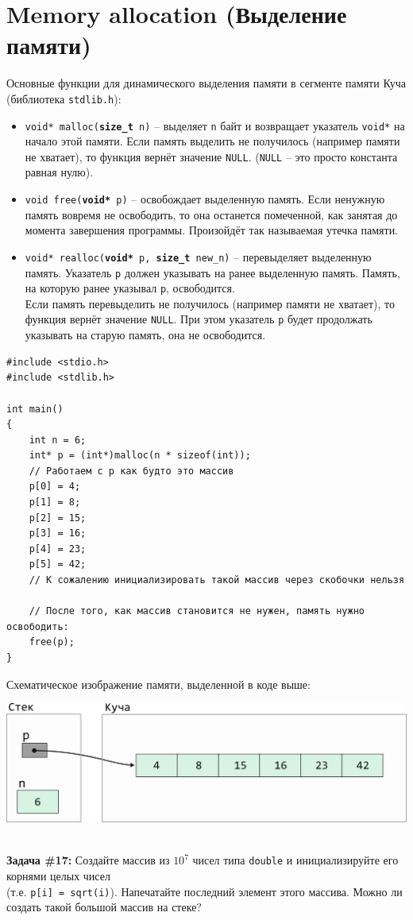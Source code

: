 \documentclass{article}
\begin{document}
\section*{Memory allocation (Выделение памяти)}
Основные функции для динамического выделения памяти в сегменте памяти Куча (библиотека \texttt{stdlib.h}):
\begin{itemize}
\item \texttt{void* malloc(\textbf{size\_t} n)} -- выделяет \texttt{n} байт и возвращает указатель \texttt{void*}
на начало этой памяти. Если память выделить не получилось (например памяти не хватает), то функция вернёт значение \texttt{NULL}. (\texttt{NULL} -- это просто константа равная нулю). \\
\item \texttt{void free(\textbf{void*} p)} -- освобождает выделенную память. Если ненужную память вовремя не освободить, то она останется помеченной, как занятая до момента завершения программы. Произойдёт так называемая утечка памяти.\\
\item \texttt{void* realloc(\textbf{void*} p, \textbf{size\_t} new\_n)} -- перевыделяет выделенную память. Указатель \texttt{p} должен указывать на ранее выделенную память. Память, на которую ранее указывал \texttt{p}, освободится. \\
Если память перевыделить не получилось (например памяти не хватает), то функция вернёт значение \texttt{NULL}. При этом указатель \texttt{p} будет продолжать указывать на старую память, она не освободится.\\
\end{itemize}
\begin{lstlisting}
#include <stdio.h>
#include <stdlib.h>

int main()
{
	int n = 6;
	int* p = (int*)malloc(n * sizeof(int)); 
	// Работаем с p как будто это массив
	p[0] = 4;
	p[1] = 8;
	p[2] = 15;
	p[3] = 16;
	p[4] = 23;
	p[5] = 42;
	// К сожалению инициализировать такой массив через скобочки нельзя
	
	// После того, как массив становится не нужен, память нужно освободить:
	free(p);
}
\end{lstlisting}
Схематическое изображение памяти, выделенной в коде выше:
\begin{center}
\includegraphics[scale=0.9]{../images/pointer_schemes/pointer_to_heap_array.png}
\end{center}
\quad\\
\textbf{Задача \#17:} Создайте массив из $10^7$ чисел типа \texttt{double} и инициализируйте его корнями
целых чисел\\ (т.е. \texttt{p[i] = sqrt(i)}). Напечатайте последний элемент этого массива. Можно ли 
создать такой большой массив на стеке?
\end{document}
